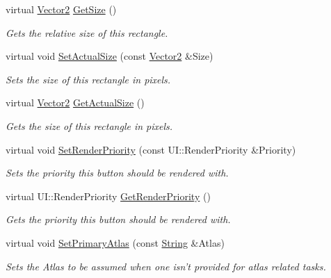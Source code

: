 \begin{DoxyCompactItemize}
virtual \hyperlink{classphys_1_1Vector2}{Vector2} \hyperlink{classphys_1_1UI_1_1Rectangle_a5f54debc5c435cda9505b40ce82f4f24}{GetSize} ()
\begin{DoxyCompactList}\small\item\em Gets the relative size of this rectangle. \item\end{DoxyCompactList}\item 
virtual void \hyperlink{classphys_1_1UI_1_1Rectangle_ab2afb04d539b2b1fc384fa1050b1ba21}{SetActualSize} (const \hyperlink{classphys_1_1Vector2}{Vector2} \&Size)
\begin{DoxyCompactList}\small\item\em Sets the size of this rectangle in pixels. \item\end{DoxyCompactList}\item 
virtual \hyperlink{classphys_1_1Vector2}{Vector2} \hyperlink{classphys_1_1UI_1_1Rectangle_ae29501765e3af7eac37d5ac581e77b24}{GetActualSize} ()
\begin{DoxyCompactList}\small\item\em Gets the size of this rectangle in pixels. \item\end{DoxyCompactList}\item 
virtual void \hyperlink{classphys_1_1UI_1_1Rectangle_a79a98cac2cdd05d6ea6fa3865c9c4b6e}{SetRenderPriority} (const UI::RenderPriority \&Priority)
\begin{DoxyCompactList}\small\item\em Sets the priority this button should be rendered with. \item\end{DoxyCompactList}\item 
virtual UI::RenderPriority \hyperlink{classphys_1_1UI_1_1Rectangle_a8445b7d0dcb2c92f29aeadac305af420}{GetRenderPriority} ()
\begin{DoxyCompactList}\small\item\em Gets the priority this button should be rendered with. \item\end{DoxyCompactList}\item 
virtual void \hyperlink{classphys_1_1UI_1_1Rectangle_a275a1495bdbb3829b5f94525d6caa9ed}{SetPrimaryAtlas} (const \hyperlink{namespacephys_aa03900411993de7fbfec4789bc1d392e}{String} \&Atlas)
\begin{DoxyCompactList}\small\item\em Sets the Atlas to be assumed when one isn't provided for atlas related tasks. \item\end{DoxyCompactList}\item 

\end{DoxyCompactItemize}
